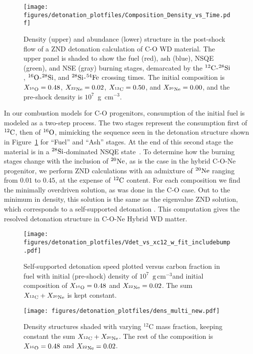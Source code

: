 \documentclass[iop,apj]{emulateapj}
\newcommand{\C}[1]{\ensuremath{{}^{#1}{\rm C}}}
\newcommand{\Ox}[1]{\ensuremath{{}^{#1}{\rm O}}}
\newcommand{\Ne}[1]{\ensuremath{{}^{#1}{\rm Ne}}}
\newcommand{\Si}[1]{\ensuremath{{}^{#1}{\rm Si}}}
\newcommand{\Fe}[1]{\ensuremath{{}^{#1}{\rm Fe}}}
\newcommand{\unitspace}{\ensuremath{\,}}
\newcommand{\usp}{\unitspace}
\newcommand{\unitstyle}[1]{\ensuremath{\mathrm{#1}}}
\newcommand{\power}[2]{\ensuremath{{#1}^{#2}}}
\newcommand{\centi}{\unitstyle{c}}
\newcommand{\meter}{\unitstyle{m}}
\newcommand{\cm}{\centi\meter}
\newcommand{\gram}{\unitstyle{g}}
\newcommand{\grampercc}{\gram\usp\power{\cm}{-3}} %
\begin{document}
\begin{figure}[t]
  \texttt{[image: figures/detonation\_plotfiles/Composition\_Density\_vs\_Time.pdf]}
	\caption{\label{fig:co_znd_stages} Density (upper) and
          abundance (lower) structure in the post-shock flow of a ZND
          detonation calculation of C-O WD material. The upper panel is shaded to show
          the fuel (red), ash (blue), NSQE (green), and NSE (gray) burning stages, demarcated by the \C{12}-\Si{28}, \Ox{16}-\Si{28}, and
          \Si{28}-\Fe{54} crossing times. The initial composition is
          $X_{^{16}\rm O} = 0.48$, $X_{^{22}\rm Ne} = 0.02$,
          $X_{^{12}\rm C} = 0.50$, and $X_{^{20}\rm Ne} = 0.00$, and
          the pre-shock density is $10^7$~g~cm$^{-3}$.}
\end{figure}


In our combustion models for C-O progenitors, consumption of the
initial fuel is modeled as a two-step process. The two stages
represent the consumption first of \C{12}, then of \Ox{16}, mimicking
the sequence seen in the detonation structure shown in
Figure~\ref{fig:co_znd_stages} for ``Fuel'' and ``Ash'' stages. At the
end of this second stage the material is in a \Si{28}-dominated NSQE
state~\citep{Caldetal07,townsley.calder.ea:flame}. To determine how
the burning stages change with the inclusion of \Ne{20}, as is the
case in the hybrid C-O-Ne progenitor, we perform ZND calculations with
an admixture of \Ne{20} ranging from $0.01$ to $0.45$, at the expense
of \C{12} content. For each composition we find the minimally
overdriven solution, as was done in the C-O case. Out to the minimum
in density, this solution is the same as the eigenvalue ZND solution,
which corresponds to a self-supported detonation \citep{FickDavi79,townetal15}.
This computation gives the resolved detonation structure in C-O-Ne Hybrid WD matter.

\begin{figure}
	\texttt{[image: figures/detonation\_plotfiles/Vdet\_vs\_xc12\_w\_fit\_includebump.pdf]}
	\caption{\label{fig:detonation_velocity_wfit} Self-supported detonation speed plotted versus carbon fraction in fuel with initial (pre-shock) density of $10^7$~\grampercc and initial composition of $X_{^{16}\rm O} = 0.48$ and $X_{^{22}\rm Ne} = 0.02$. The sum $X_{^{12}\rm C} + X_{^{20}\rm Ne}$ is kept constant.\\}
\end{figure}

\begin{figure}[t]
	\texttt{[image: figures/detonation\_plotfiles/dens\_multi\_new.pdf]}
        \caption{\label{fig:co_znd_multi_den}} Density structures shaded with varying $^{12}$C mass fraction, keeping constant the sum $X_{^{12}\rm C} + X_{^{20}\rm Ne}$. The rest of the composition is $X_{^{16}\rm O} = 0.48$ and $X_{^{22}\rm Ne} = 0.02$.
\end{figure}
\end{document}
